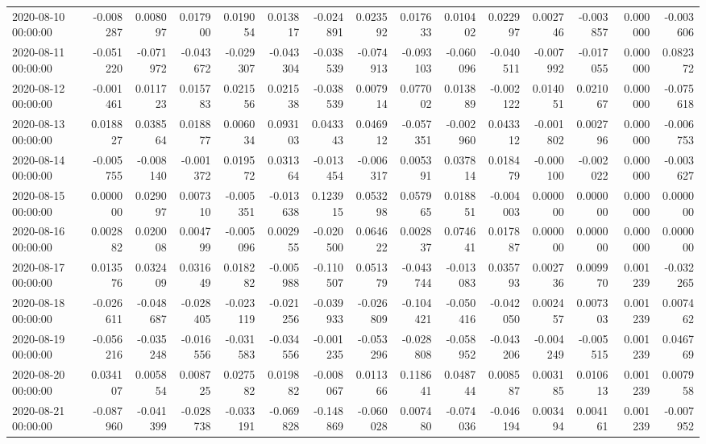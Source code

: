 \begin{tabular}{lrrrrrrrrrrrrrr}
2020-08-10 00:00:00 & -0.008287 & 0.008097 & 0.017900 & 0.019054 & 0.013817 & -0.024891 & 0.023592 & 0.017633 & 0.010402 & 0.022997 & 0.002746 & -0.003857 & 0.000000 & -0.003606 \\
2020-08-11 00:00:00 & -0.051220 & -0.071972 & -0.043672 & -0.029307 & -0.043304 & -0.038539 & -0.074913 & -0.093103 & -0.060096 & -0.040511 & -0.007992 & -0.017055 & 0.000000 & 0.082372 \\
2020-08-12 00:00:00 & -0.001461 & 0.011723 & 0.015783 & 0.021556 & 0.021538 & -0.038539 & 0.007914 & 0.077002 & 0.013889 & -0.002122 & 0.014051 & 0.021067 & 0.000000 & -0.075618 \\
2020-08-13 00:00:00 & 0.018827 & 0.038564 & 0.018877 & 0.006034 & 0.093103 & 0.043343 & 0.046912 & -0.057351 & -0.002960 & 0.043312 & -0.001802 & 0.002796 & 0.000000 & -0.006753 \\
2020-08-14 00:00:00 & -0.005755 & -0.008140 & -0.001372 & 0.019572 & 0.031364 & -0.013454 & -0.006317 & 0.005391 & 0.037814 & 0.018479 & -0.000100 & -0.002022 & 0.000000 & -0.003627 \\
2020-08-15 00:00:00 & 0.000000 & 0.029097 & 0.007310 & -0.005351 & -0.013638 & 0.123915 & 0.053298 & 0.057965 & 0.018851 & -0.004003 & 0.000000 & 0.000000 & 0.000000 & 0.000000 \\
2020-08-16 00:00:00 & 0.002882 & 0.020008 & 0.004799 & -0.005096 & 0.002955 & -0.020500 & 0.064622 & 0.002837 & 0.074641 & 0.017887 & 0.000000 & 0.000000 & 0.000000 & 0.000000 \\
2020-08-17 00:00:00 & 0.013576 & 0.032409 & 0.031649 & 0.018282 & -0.005988 & -0.110507 & 0.051379 & -0.043744 & -0.013083 & 0.035793 & 0.002736 & 0.009970 & 0.001239 & -0.032265 \\
2020-08-18 00:00:00 & -0.026611 & -0.048687 & -0.028405 & -0.023119 & -0.021256 & -0.039933 & -0.026809 & -0.104421 & -0.050416 & -0.042050 & 0.002457 & 0.007303 & 0.001239 & 0.007462 \\
2020-08-19 00:00:00 & -0.056216 & -0.035248 & -0.016556 & -0.031583 & -0.034556 & -0.001235 & -0.053296 & -0.028808 & -0.058952 & -0.043206 & -0.004249 & -0.005515 & 0.001239 & 0.046769 \\
2020-08-20 00:00:00 & 0.034107 & 0.005854 & 0.008725 & 0.027582 & 0.019882 & -0.008067 & 0.011366 & 0.118641 & 0.048744 & 0.008587 & 0.003185 & 0.010613 & 0.001239 & 0.007958 \\
2020-08-21 00:00:00 & -0.087960 & -0.041399 & -0.028738 & -0.033191 & -0.069828 & -0.148869 & -0.060028 & 0.007480 & -0.074036 & -0.046194 & 0.003494 & 0.004161 & 0.001239 & -0.007952 \\

\end{tabular}
